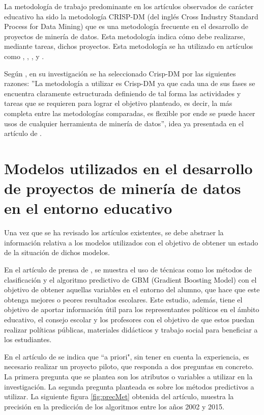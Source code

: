 La metodología de trabajo predominante en los artículos observados de carácter educativo ha sido la metodología CRISP-DM (del inglés Cross Industry Standard Process for Data Mining) que es una metodología frecuente en el desarrollo de proyectos de minería de datos. Esta metodología indica cómo debe realizarse, mediante tareas, dichos proyectos. Esta metodología se ha utilizado en artículos como , , ,  y .

Según , en su investigación se ha seleccionado Crisp-DM por las siguientes razones: ''La metodología a utilizar es Crisp-DM ya que cada una de sus fases se encuentra claramente estructurada definiendo de tal forma las actividades y tareas que se requieren para lograr el objetivo planteado, es decir, la más completa entre las metodologías comparadas, es flexible por ende se puede hacer usos de cualquier herramienta de minería de datos'', idea ya presentada en el artículo de \cite{moine2011analisis}.

\section{Modelos utilizados en el desarrollo de proyectos de minería de datos en el entorno educativo}
Una vez que se ha revisado los artículos existentes, se debe abstraer la información relativa a los modelos utilizados con el objetivo de obtener un estado de la situación de dichos modelos.

En el artículo de prensa de , se muestra el uso de técnicas como los métodos de clasificación y el algoritmo predictivo de GBM (Gradient Boosting Model) con el objetivo de obtener aquellas variables en el entorno del alumno, que hace que este obtenga mejores o peores resultados escolares. Este estudio, además, tiene el objetivo de aportar información útil para los representantes políticos en el ámbito educativo, el consejo escolar y los profesores con el objetivo de que estos puedan realizar políticas públicas, materiales didácticos y trabajo social para beneficiar a los estudiantes.

En el artículo de  se indica que ``a priori", sin tener en cuenta la experiencia, es necesario realizar un proyecto piloto, que responda a dos preguntas en concreto. La primera pregunta que se plantea son los atributos o variables a utilizar en la investigación. La segunda pregunta planteada es sobre los métodos predictivos a utilizar. La siguiente figura \ref{fig:precMet} obtenida del artículo, muestra la precisión en la predicción de los algoritmos entre los años 2002 y 2015.

